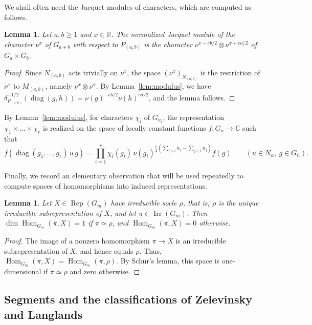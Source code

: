 \documentclass[11pt]{amsart}
\numberwithin{equation}{section}
\theoremstyle{plain}
\newtheorem{lemma}[theorem]{Lemma}
\theoremstyle{definition}
\theoremstyle{remark}
\newcommand{\R}{\mathbb{R}}
\newcommand{\C}{\mathbb{C}}
\DeclareMathOperator{\Hom}{Hom}
\DeclareMathOperator{\Irr}{Irr}
\DeclareMathOperator{\Rep}{Rep}
\DeclareMathOperator{\diag}{diag}
\begin{document}
We shall often need the Jacquet modules of characters, which are computed as follows.

\begin{lemma}\label{lem:jacquet-char}
	Let $a,b\ge1$ and $x\in\R$. The normalized Jacquet module of the character $\nu^x$ of $G_{a+b}$ with respect to $P_{(a,b)}$ is the character $\nu^{x-eb/2}\otimes\nu^{x+ea/2}$ of $G_a\times G_b$.
\end{lemma}

\begin{proof}
	Since $N_{(a,b)}$ acts trivially on $\nu^x$, the space $(\nu^x)_{N_{(a,b)}}$ is the restriction of $\nu^x$ to $M_{(a,b)}$, namely $\nu^x\otimes\nu^x$. By Lemma~\ref{lem:modulus}, we have $\delta_{P_{(a,b)}}^{-1/2}(\diag(g,h))=\nu(g)^{-eb/2}\nu(h)^{ea/2}$, and the lemma follows.
\end{proof}

By Lemma~\ref{lem:modulus}, for characters $\chi_i$ of $G_{n_i}$, the representation $\chi_1\times\dots\times\chi_r$ is realized on the space of locally constant functions $f\colon G_n\to\C$ such that
\begin{equation}\label{eq:char-induced}
	f(\diag(g_1,\dots,g_r)\,u\,g)=\prod_{i=1}^r\chi_i(g_i)\,\nu(g_i)^{\frac e2\left(\sum_{j>i}n_j-\sum_{j<i}n_j\right)}f(g)\qquad(u\in N_\alpha,\ g\in G_n).
\end{equation}

Finally, we record an elementary observation that will be used repeatedly to compute spaces of homomorphisms into induced representations.

\begin{lemma}\label{lem:socle-hom}
	Let $X\in\Rep(G_m)$ have irreducible socle $\rho$, that is, $\rho$ is the unique irreducible subrepresentation of $X$, and let $\pi\in\Irr(G_m)$. Then $\dim\Hom_{G_m}(\pi,X)=1$ if $\pi\simeq\rho$, and $\Hom_{G_m}(\pi,X)=0$ otherwise.
\end{lemma}

\begin{proof}
	The image of a nonzero homomorphism $\pi\to X$ is an irreducible subrepresentation of $X$, and hence equals $\rho$. Thus, $\Hom_{G_m}(\pi,X)=\Hom_{G_m}(\pi,\rho)$. By Schur's lemma, this space is one-dimensional if $\pi\simeq\rho$ and zero otherwise.
\end{proof}

\subsection{Segments and the classifications of Zelevinsky and Langlands}\label{ss:segments}
\end{document}

